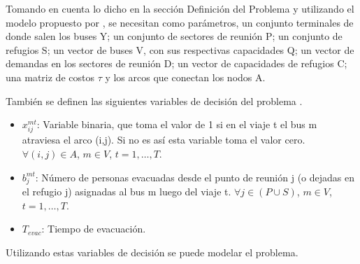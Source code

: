 \documentclass[letter, 10pt]{article}
\begin{document}
Tomando en cuenta lo dicho en la sección Definición del Problema y utilizando el modelo propuesto por \cite{bish2011planning}, se necesitan como parámetros, un conjunto terminales de donde salen los buses Y; un conjunto de sectores de reunión P; un conjunto de refugios S; un vector de buses V, con sus respectivas capacidades Q; un vector de demandas en los sectores de reunión D; un vector de capacidades de refugios C; una matriz de costos $\tau$ y los arcos que conectan los nodos A.

También se definen las siguientes variables de decisión del problema .

\begin{itemize}
\item $x_{ij}^{mt}$: Variable binaria, que toma el valor de 1 si en el viaje t el bus m atraviesa el arco (i,j). Si no es así esta variable toma el valor cero. $\forall (i,j) \in A$, $m \in V$, $t = 1,\dots,T$.
\item $b_j^{mt}$: Número de personas evacuadas desde el punto de reunión j (o dejadas en el refugio j) asignadas al bus m luego del viaje t. $\forall j \in (P \cup S)$, $m \in V$, $t = 1,\dots,T$.
\item $T_{evac}$: Tiempo de evacuación.
\end{itemize}

Utilizando estas variables de decisión se puede modelar el problema.
\end{document}
